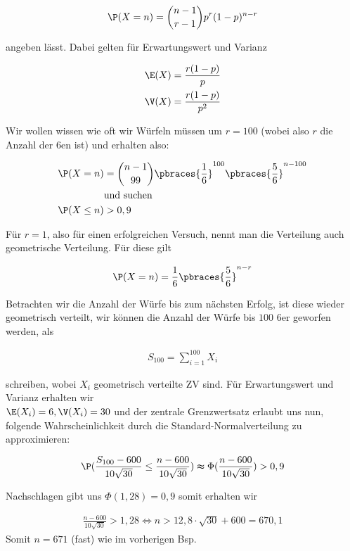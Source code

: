 \begin{solution}
\begin{align*}
  \P(X=n) = \binom{n-1}{r-1}p^r(1-p)^{n-r}
\end{align*}

angeben lässt. Dabei gelten für Erwartungswert und Varianz

\begin{align}
  \E(X) &= \frac{r(1-p)}{p} \nonumber \\
  \V(X) &= \frac{r(1-p)}{p^2}
\end{align}

Wir wollen wissen wie oft wir Würfeln müssen um $r=100$ (wobei also $r$ die
Anzahl der $6$en ist) und erhalten also:

\begin{align*}
  \P(X=n) &= \binom{n-1}{99}\pbraces{\frac{1}{6}}^{100}\pbraces{\frac{5}{6}}^{n-100} \\
  &\text{und suchen} \\
  \P(X \leq n) &> 0,9
\end{align*}

Für $r=1$, also für einen erfolgreichen Versuch, nennt man die Verteilung auch
geometrische Verteilung. Für diese gilt

\begin{align*}
  \P(X=n)=\frac{1}{6}\pbraces{\frac{5}{6}}^{n-r}
\end{align*}

Betrachten wir die Anzahl der Würfe bis zum nächsten Erfolg, ist diese wieder
geometrisch verteilt, wir können die Anzahl der Würfe bis $100$ $6$er geworfen
werden, als

\begin{align*}
  S_{100} = \sum_{i=1}^{100}X_i
\end{align*}

schreiben, wobei $X_i$ geometrisch verteilte ZV sind. Für Erwartungswert und
Varianz erhalten wir \\
$\E(X_i)=6, \V(X_i)=30$ und der zentrale Grenzwertsatz erlaubt uns nun, folgende
Wahrscheinlichkeit durch die Standard-Normalverteilung zu approximieren:

\begin{align*}
  \P(\frac{S_{100}-600}{10\sqrt{30}} \leq \frac{n-600}{10\sqrt{30}}) \thickapprox
  \Phi(\frac{n-600}{10\sqrt{30}}) > 0,9
\end{align*}

Nachschlagen gibt uns $\Phi(1,28)=0,9$ somit erhalten wir

\begin{align*}
  \frac{n-600}{10\sqrt{30}} > 1,28 \Leftrightarrow
  n > 12,8 \cdot \sqrt{30} + 600 = 670,1
\end{align*}
Somit $n=671$ (fast) wie im vorherigen Bsp.



\end{solution}

